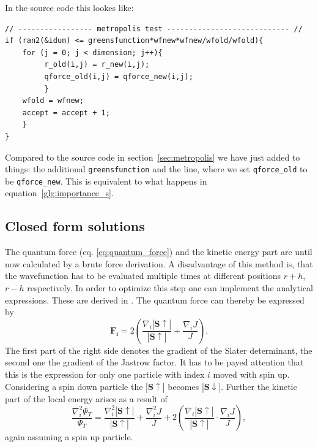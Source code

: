 In the source code this lookes like:
\begin{lstlisting}
// ----------------- metropolis test ---------------------------- //
if (ran2(&idum) <= greensfunction*wfnew*wfnew/wfold/wfold){
    for (j = 0; j < dimension; j++){
         r_old(i,j) = r_new(i,j);
         qforce_old(i,j) = qforce_new(i,j); 
         }
    wfold = wfnew;
    accept = accept + 1;
    }
}
\end{lstlisting}
Compared to the source code in section~\ref{sec:metropolis} we have just added to things: the additional \texttt{greensfunction} and the line, where we set \texttt{qforce\_old} to be \texttt{qforce\_new}. This is equivalent to what happens in equation~\ref{glg:importance_s}.
\subsection{Closed form solutions}\label{sec:closed_form}
The quantum force (eq. \ref{eq:quantum_force}) and the kinetic energy part  are until now calculated by a brute force derivation. A disadvantage of this method is, that the wavefunction has to be evaluated multiple times at different positions $r+h$, $r-h$ respectively. In order to optimize this step one can implement the analytical expressions. These are derived in \citet{hogberget2013}. The quantum force can thereby be expressed by
\begin{equation}
\mathbf{F_i} = 2 \left( \frac{\nabla_i |\mathbf{S\uparrow}|}{|\mathbf{S\uparrow}|} + \frac{\nabla_i J}{J} \right).
\end{equation}
The first part of the right side denotes the gradient of the Slater determinant, the second one the gradient of the Jastrow factor. It has to be payed attention that this is the expression for only one particle with index $i$ moved with spin up. Considering a spin down particle the $|\mathbf{S\uparrow}|$ becomes $|\mathbf{S\downarrow}|$. Further the kinetic part of the local energy arises as a result of
\begin{equation}
\frac{\nabla_i^2 \Psi_T}{\Psi_T} = \frac{\nabla_i^2 |\mathbf{S\uparrow}|}{|\mathbf{S\uparrow}|} + \frac{\nabla_i^2 J}{J} + 2\left( \frac{\nabla_i |\mathbf{S\uparrow}|}{|\mathbf{S\uparrow}|} \cdot \frac{\nabla_i J}{J} \right),
\end{equation}
again assuming a spin up particle.

